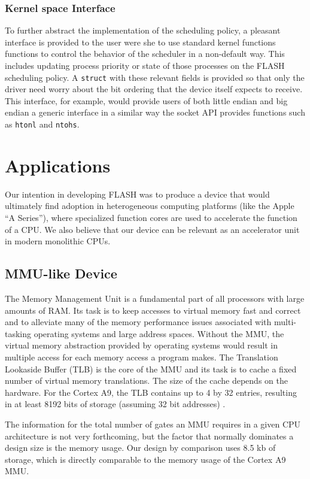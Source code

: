 \documentclass{sig-alternate-10pt}
\begin{document}
\subsubsection{Kernel space Interface}
To further abstract the implementation of the scheduling policy, a pleasant
interface is provided to the user were she to use standard kernel functions
functions to control the behavior of the scheduler in a non-default way.
This includes updating process priority or state of those processes on the
FLASH scheduling policy.  A \texttt{struct} with these relevant fields is
provided so that only the driver need worry about the bit ordering that the
device itself expects to receive.  This interface, for example, would
provide users of both little endian and big endian a generic interface in
a similar way the socket API provides functions such as \texttt{htonl} and
\texttt{ntohs}.


\section{Applications}
\label{sec:apps}
Our intention in developing FLASH was to produce a device that would ultimately find adoption in heterogeneous computing platforms (like the Apple ``A Series''), where specialized function cores are used to accelerate the function of a CPU. We also believe that our device can be relevant as an accelerator unit in modern monolithic CPUs.

\subsection{MMU-like Device}
\label{subsec:mmu}
The Memory Management Unit is a fundamental part of all processors with
large amounts of RAM. Its task is to keep accesses to virtual memory fast
and correct and to alleviate many of the memory performance issues
associated with multi-tasking operating systems and large address spaces.
Without the MMU, the virtual memory abstraction provided by operating
systems would result in multiple access for each memory access a program
makes. The Translation Lookaside Buffer (TLB) is the core of the MMU and its
task is to cache a fixed number of virtual memory translations. The size of
the cache depends on the hardware. For the Cortex A9, the TLB contains up to
4 by 32 entries, resulting in at least 8192 bits of storage (assuming 32 bit
addresses) \cite{arm_mmu}.

The information for the total number of gates an MMU requires in a given CPU architecture is not very forthcoming, but the factor that normally dominates a design size is the memory usage. Our design by comparison uses 8.5 kb of storage, which is directly comparable to the memory usage of the Cortex A9 MMU.
\end{document}
